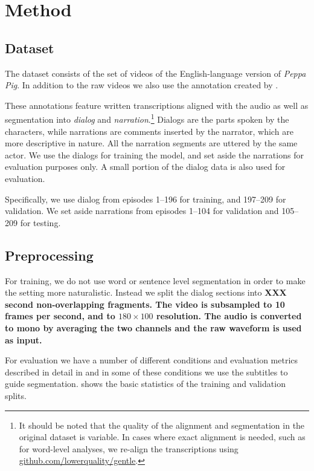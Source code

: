 \section{Method}
\label{sec:method}

\subsection{Dataset}
The dataset consists of the set of videos of the
English-language version of {\it Peppa Pig}. In addition to the raw
videos we  also use the annotation created by
\citet{papasarantopoulos2021narration}.

These annotations feature written transcriptions aligned with the
audio as well as segmentation into {\it dialog} and {\it
  narration}.\footnote{It should be noted that the quality of the
  alignment and segmentation in the original dataset is variable. In
  cases where exact alignment is needed, such as for word-level
  analyses, we re-align the transcriptions using
  \url{github.com/lowerquality/gentle}.}  Dialogs are the parts spoken
by the characters, while narrations are comments inserted by the
narrator, which are more descriptive in nature. All the narration
segments are uttered by the same actor. We use the dialogs for
training the model, and set aside the narrations for evaluation
purposes only. A small portion of the dialog data is also used for
evaluation.

Specifically, we use dialog from episodes 1--196 for training, and
197--209 for validation. We set aside narrations from episodes 1--104
for validation and 105--209 for testing.


\subsection{Preprocessing}
For training, we do not use word or sentence level segmentation in
order to make the setting more naturalistic. Instead we split the
dialog sections into \bf{XXX}  second non-overlapping fragments. The video
is subsampled to 10 frames per second, and to $180\times 100$ resolution. The
audio is converted to mono by averaging the two channels  and the raw
waveform is used as input.


For evaluation we have a number of different conditions and evaluation
metrics described in detail in  and in some of these
conditions we use the subtitles to guide
segmentation.  shows the basic statistics of the
training and validation splits.

